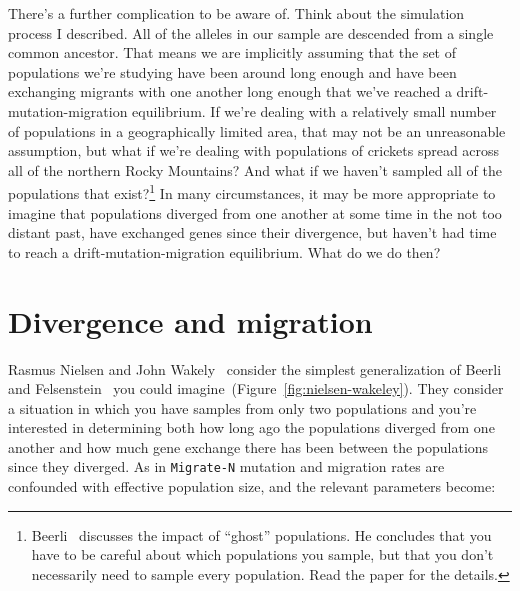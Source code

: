 There's a further complication to be aware of. Think about the
simulation process I described. All of the alleles in our sample are
descended from a single common ancestor. That means we are implicitly
assuming that the set of populations we're studying have been around
long enough and have been exchanging migrants with one another long
enough that we've reached a drift-mutation-migration equilibrium. If
we're dealing with a relatively small number of populations in a
geographically limited area, that may not be an unreasonable
assumption, but what if we're dealing with populations of crickets
spread across all of the northern Rocky Mountains? And what if we
haven't sampled all of the populations that
exist?\footnote{Beerli~\cite{Beerli-2004} discusses the impact of
  ``ghost'' populations. He concludes that you have to be careful
  about which populations you sample, but that you don't necessarily
  need to sample every population. Read the paper for the details.} In
many circumstances, it may be more appropriate to imagine that
populations diverged from one another at some time in the not too
distant past, have exchanged genes since their divergence, but haven't
had time to reach a drift-mutation-migration equilibrium. What do we
do then?

\section*{Divergence and migration}

Rasmus Nielsen and John Wakely~\cite{Nielsen-Wakeley-2001} consider
the simplest generalization of Beerli and
Felsenstein~\cite{Beerli-Felsenstein-1999,Beerli-Felsenstein-2001} you
could imagine~(Figure~\ref{fig:nielsen-wakeley}). They consider a
situation in which you have samples from only two populations and
you're interested in determining both how long ago the populations
diverged from one another and how much gene exchange there has been
between the populations since they diverged. As in {\tt Migrate-N}
mutation and migration rates are confounded with effective population
size, and the relevant parameters become:

